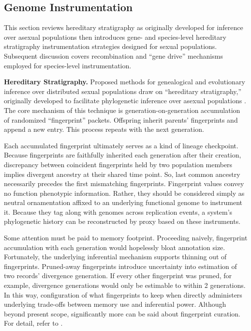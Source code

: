 \subsection{Genome Instrumentation}
\label{sec:genome-instrumentation}

This section reviews hereditary stratigraphy as originally developed for inference over asexual populations then introduces gene- and species-level hereditary stratigraphy instrumentation strategies designed for sexual populations.
Subsequent discussion covers recombination and ``gene drive'' mechanisms employed for species-level instrumentation.


% 
% 
\textbf{Hereditary Stratigraphy.}
Proposed methods for genealogical and evolutionary inference over distributed sexual populations draw on ``hereditary stratigraphy,'' originally developed to facilitate phylogenetic inference over asexual populations \citep{moreno2022hstrat}.
The core mechanism of this technique is generation-on-generation accumulation of randomized ``fingerprint'' packets.
Offspring inherit parents' fingerprints and append a new entry.
This process repeats with the next generation.

Each accumulated fingerprint ultimately serves as a kind of lineage checkpoint.
Because fingerprints are faithfully inherited each generation after their creation, discrepancy between coincident fingerprints held by two population members implies divergent ancestry at their shared time point.
So, last common ancestry necessarily precedes the first mismatching fingerprints.
Fingerprint values convey no function phenotypic information.
Rather, they should be considered simply as neutral ornamentation affixed to an underlying functional genome to instrument it.
Because they tag along with genomes across replication events, a system's phylogenetic history can be reconstructed by proxy based on these instruments.

Some attention must be paid to memory footprint.
Proceeding naively, fingerprint accumulation with each generation would hopelessly bloat annotation size.
Fortunately, the underlying inferential mechanism supports thinning out of fingerprints.
Pruned-away fingerprints introduce uncertainty into estimation of two records' divergence generation.
If every other fingerprint was pruned, for example, divergence generations would only be estimable to within 2 generations.
In this way, configuration of what fingerprints to keep when directly administers underlying trade-offs between memory use and inferential power.
Although beyond present scope, significantly more can be said about fingerprint curation.
For detail, refer to \citep{moreno2022hereditary}.

